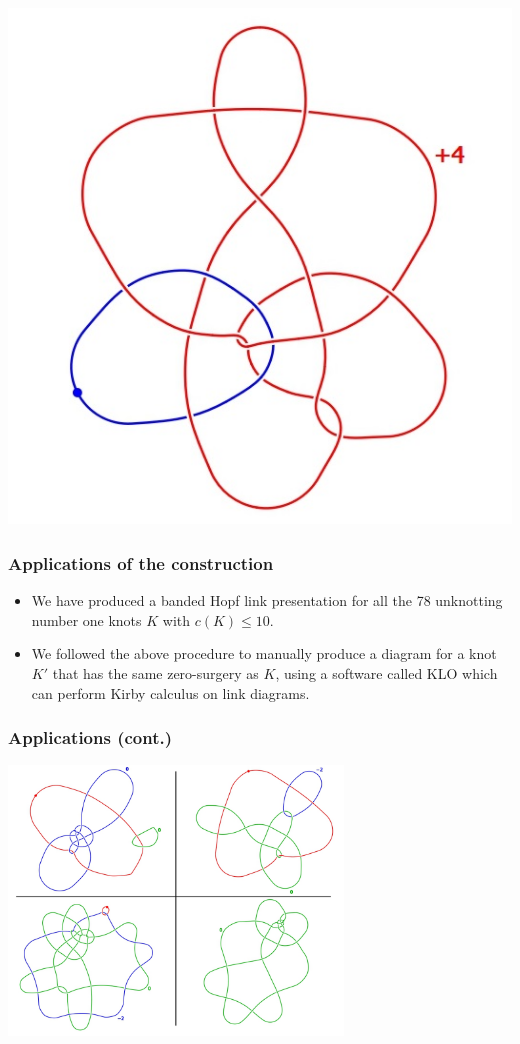 \documentclass{beamer}
\theoremstyle{ex}
\theoremstyle{rem}
\begin{document}
\begin{frame}
\begin{itemize}
\begin{center}
				\includegraphics[scale=0.25]{10_125_3}
			\end{center}
		\end{itemize}
	\end{frame}

\begin{frame}
	\frametitle{Applications of the construction}
	\begin{itemize}
		\item We have produced a banded Hopf link presentation for all the 78 unknotting number one knots $K$ with $c(K)\leq 10$.
		\item We followed the above procedure to manually produce a diagram for a knot $K'$ that has the same zero-surgery as $K$, using a software called KLO which can perform Kirby calculus on link diagrams.
	\end{itemize}
\end{frame}

\begin{frame}
	\frametitle{Applications (cont.)}
	\begin{center}
	\includegraphics[width = 3.5in]{Fullseq.png}
	\end{center}
\end{frame}
\end{document}
